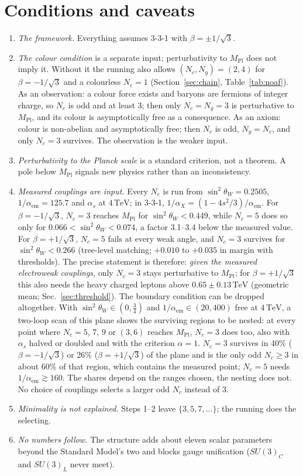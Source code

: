 \documentclass[11pt,a4paper]{article}
\newcommand{\Nc}{N_c}
\newcommand{\Ng}{N_g}
\newcommand{\MPl}{M_{\mathrm{Pl}}}
\newcommand{\sw}{\sin^2\theta_W}
\newcommand{\TeV}{\,\mathrm{TeV}}
\begin{document}
\section{Conditions and caveats}\label{sec:caveats}

\begin{enumerate}
\item \emph{The framework.} Everything assumes 3-3-1 with $\beta=\pm1/\sqrt3$.
\item \emph{The colour condition} is a separate input; perturbativity to $\MPl$ does not
imply it. Without it the running also allows $(\Nc,\Ng)=(2,4)$ for $\beta=-1/\sqrt3$ and a
colourless $\Nc=1$ (Section~\ref{sec:chain}, Table~\ref{tab:noaf}). As an observation: a
colour force exists and baryons are fermions of integer charge, so $\Nc$ is odd and at
least 3; then only $\Nc=\Ng=3$ is perturbative to $\MPl$, and its colour is asymptotically
free as a consequence. As an axiom: colour is non-abelian and asymptotically free; then
$\Nc$ is odd, $\Ng=\Nc$, and only $\Nc=3$ survives. The observation is the weaker input.
\item \emph{Perturbativity to the Planck scale} is a standard criterion, not a theorem. A
pole below $\MPl$ signals new physics rather than an inconsistency.
\item \emph{Measured couplings are input.} Every $\Nc$ is run from $\sw=0.2505$,
$1/\alpha_{\text{em}}=125.7$ and $\alpha_s$ at $4\TeV$; in 3-3-1,
$1/\alpha_X=(1-4s^2/3)/\alpha_{\text{em}}$. For $\beta=-1/\sqrt3$, $\Nc=3$ reaches $\MPl$
for $\sw<0.449$, while $\Nc=5$ does so only for $0.066<\sw<0.074$, a factor 3.1--3.4
below the measured value. For $\beta=+1/\sqrt3$, $\Nc=5$ fails at every weak angle, and
$\Nc=3$ survives for $\sw<0.266$ (tree-level matching; $+0.010$ to $+0.035$ in margin with
thresholds). The precise statement is therefore: \emph{given the measured electroweak
couplings}, only $\Nc=3$ stays perturbative to $\MPl$; for $\beta=+1/\sqrt3$ this also
needs the heavy charged leptons above $0.65\pm0.13\TeV$ (geometric mean; Sec.~\ref{sec:threshold}).
The boundary condition can be dropped altogether. With $\sw\in(0,\tfrac34)$ and
$1/\alpha_{\text{em}}\in(20,400)$ free at $4\TeV$, a two-loop scan of this plane shows the
surviving regions to be nested: at every point where $\Nc=5$, $7$, $9$ or $(3,6)$ reaches
$\MPl$, $\Nc=3$ does too, also with $\alpha_s$ halved or doubled and with the criterion
$\alpha=1$. $\Nc=3$ survives in 40\% ($\beta=-1/\sqrt3$) or 26\% ($\beta=+1/\sqrt3$) of the
plane and is the only odd $\Nc\ge3$ in about 60\% of that region, which contains the
measured point; $\Nc=5$ needs $1/\alpha_{\text{em}}\gtrsim160$. The shares depend on the
ranges chosen, the nesting does not. No choice of couplings selects a larger odd $\Nc$
instead of 3.
\item \emph{Minimality is not explained.} Steps 1--2 leave $\{3,5,7,\dots\}$; the running
does the selecting.
\item \emph{No numbers follow.} The structure adds about eleven scalar parameters beyond
the Standard Model's two and blocks gauge unification ($SU(3)_C$ and $SU(3)_L$ never meet).
\end{enumerate}
\end{document}
